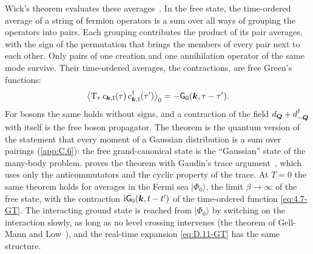 Wick's theorem evaluates these averages~\cite{wick1950evaluation}. In the free state, the time-ordered average of a string of fermion operators is a sum over all ways of grouping the operators into pairs. Each grouping contributes the product of its pair averages, with the sign of the permutation that brings the members of every pair next to each other. Only pairs of one creation and one annihilation operator of the same mode survive. Their time-ordered averages, the contractions, are free Green's functions:
\begin{equation}
  \bigl\langle\mathrm{T}_\tau\,c_{\bm{k},\mathrm{I}}(\tau)\,c^\dagger_{\bm{k},\mathrm{I}}(\tau')\bigr\rangle_0 = -\mathsf{G}_0(\bm{k},\tau - \tau') .
  \label{eq:4.8-contract}
\end{equation}
For bosons the same holds without signs, and a contraction of the field $d_{\bm{Q}} + d^\dagger_{-\bm{Q}}$ with itself is the free boson propagator. The theorem is the quantum version of the statement that every moment of a Gaussian distribution is a sum over pairings (\cref{app:C.6}): the free grand-canonical state is the ``Gaussian'' state of the many-body problem.  proves the theorem with Gaudin's trace argument~\cite{gaudin1960demonstration}, which uses only the anticommutators and the cyclic property of the trace. At $T = 0$ the same theorem holds for averages in the Fermi sea $|\Phi_0\rangle$, the limit $\beta \to \infty$ of the free state, with the contraction $\mathrm{i}\mathsf{G}_0(\bm{k},t - t')$ of the time-ordered function \cref{eq:4.7-GT}. The interacting ground state is reached from $|\Phi_0\rangle$ by switching on the interaction slowly, as long as no level crossing intervenes (the theorem of Gell-Mann and Low~\cite{gellmann1951bound}), and the real-time expansion \cref{eq:D.11-GT} has the same structure.

